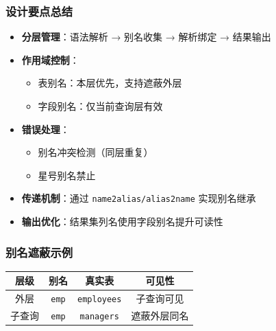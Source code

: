 \documentclass[a4paper, 12pt]{article}
\begin{document}
\subsubsection*{设计要点总结}
\begin{itemize}
    \item \textbf{分层管理}：语法解析 → 别名收集 → 解析绑定 → 结果输出
    \item \textbf{作用域控制}：
    \begin{itemize}
        \item 表别名：本层优先，支持遮蔽外层
        \item 字段别名：仅当前查询层有效
    \end{itemize}
    \item \textbf{错误处理}：
    
\begin{itemize}
        \item 别名冲突检测（同层重复）
        \item 星号别名禁止
    \end{itemize}
    \item \textbf{传递机制}：通过 \texttt{name2alias/alias2name} 实现别名继承
    \item \textbf{输出优化}：结果集列名使用字段别名提升可读性
\end{itemize}

\subsubsection*{别名遮蔽示例}
\begin{center}
\begin{tabular}{|c|c|c|c|}
    \hline
    \textbf{层级} & \textbf{别名} & \textbf{真实表} & \textbf{可见性} \\
    \hline
    外层 & \texttt{emp} & \texttt{employees} & 子查询可见 \\
    \hline
    子查询 & \texttt{emp} & \texttt{managers} & 遮蔽外层同名 \\
    \hline
\end{tabular}
\end{center}
\end{document}
